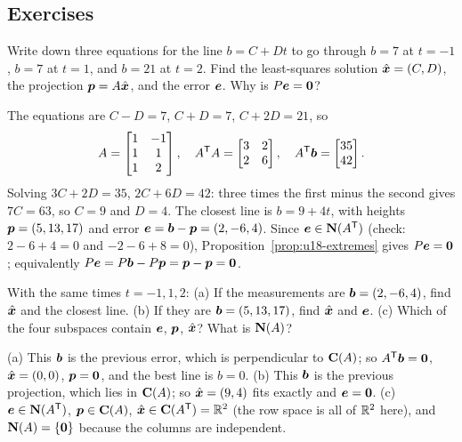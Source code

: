 \subsection{Exercises}

\begin{exercise}\label{ex:u18-ex1}
Write down three equations for the line $b=C+Dt$ to go through $b=7$ at $t=-1$, $b=7$ at
$t=1$, and $b=21$ at $t=2$. Find the least-squares solution $\hat{\boldsymbol{x}}=(C,D)$, the
projection $\boldsymbol{p}=A\hat{\boldsymbol{x}}$, and the error $\boldsymbol{e}$. Why is $P\boldsymbol{e}=\boldsymbol{0}$?
\end{exercise}

\begin{solution}
The equations are $C-D=7$, $C+D=7$, $C+2D=21$, so
\[
  A=\begin{bmatrix}1&-1\\1&1\\1&2\end{bmatrix},\quad
  A^{\mathsf{T}} A=\begin{bmatrix}3&2\\2&6\end{bmatrix},\quad
  A^{\mathsf{T}}\boldsymbol{b}=\begin{bmatrix}35\\42\end{bmatrix}.
\]
Solving $3C+2D=35$, $2C+6D=42$: three times the first minus the second gives $7C=63$, so
$C=9$ and $D=4$. The closest line is $b=9+4t$, with heights $\boldsymbol{p}=(5,13,17)$ and error
$\boldsymbol{e}=\boldsymbol{b}-\boldsymbol{p}=(2,-6,4)$. Since $\boldsymbol{e}\in\mathbf{N}(A^{\mathsf{T}})$ (check: $2-6+4=0$ and
$-2-6+8=0$), Proposition~\ref{prop:u18-extremes} gives $P\boldsymbol{e}=\boldsymbol{0}$; equivalently
$P\boldsymbol{e}=P\boldsymbol{b}-P\boldsymbol{p}=\boldsymbol{p}-\boldsymbol{p}=\boldsymbol{0}$.
\end{solution}

\begin{exercise}\label{ex:u18-ex2}
With the same times $t=-1,1,2$: (a) If the measurements are $\boldsymbol{b}=(2,-6,4)$, find
$\hat{\boldsymbol{x}}$ and the closest line. (b) If they are $\boldsymbol{b}=(5,13,17)$, find $\hat{\boldsymbol{x}}$
and $\boldsymbol{e}$. (c) Which of the four subspaces contain $\boldsymbol{e}$, $\boldsymbol{p}$, $\hat{\boldsymbol{x}}$? What
is $\mathbf{N}(A)$?
\end{exercise}

\begin{solution}
(a) This $\boldsymbol{b}$ is the previous error, which is perpendicular to $\mathbf{C}(A)$; so
$A^{\mathsf{T}}\boldsymbol{b}=\boldsymbol{0}$, $\hat{\boldsymbol{x}}=(0,0)$, $\boldsymbol{p}=\boldsymbol{0}$, and the best line is $b=0$.
(b) This $\boldsymbol{b}$ is the previous projection, which lies in $\mathbf{C}(A)$; so
$\hat{\boldsymbol{x}}=(9,4)$ fits exactly and $\boldsymbol{e}=\boldsymbol{0}$.
(c) $\boldsymbol{e}\in\mathbf{N}(A^{\mathsf{T}})$, $\boldsymbol{p}\in\mathbf{C}(A)$, $\hat{\boldsymbol{x}}\in\mathbf{C}(A^{\mathsf{T}})=\mathbb{R}^2$ (the row space
is all of $\mathbb{R}^2$ here), and $\mathbf{N}(A)=\{\boldsymbol{0}\}$ because the columns are independent.
\end{solution}

